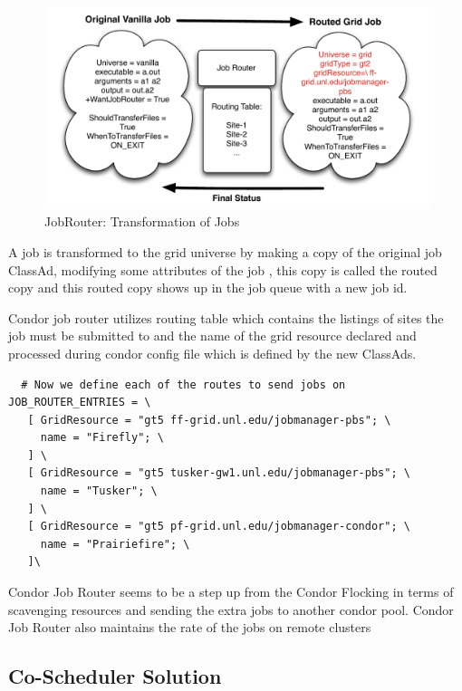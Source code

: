 \documentclass[ms,electronic,double]{nuthesis}
\begin{document}
\begin{figure}[htbp!]
\begin{center}
\includegraphics[scale=0.75]{images/jobRouter}
\caption{JobRouter: Transformation of Jobs}
\label{fig:JobRouter}
\end{center}
\end{figure}

A job is transformed to the grid universe by making a copy of the original job 
ClassAd, modifying some attributes of the job , this copy is called the routed 
copy and this routed copy shows up in the job queue with a new job id.

Condor job router utilizes routing table which contains the listings of sites 
the job must be submitted to and the name of the grid resource declared and 
processed during condor config file which is defined by the new ClassAds.

\begin{lstlisting}
  # Now we define each of the routes to send jobs on
JOB_ROUTER_ENTRIES = \
   [ GridResource = "gt5 ff-grid.unl.edu/jobmanager-pbs"; \
     name = "Firefly"; \
   ] \
   [ GridResource = "gt5 tusker-gw1.unl.edu/jobmanager-pbs"; \
     name = "Tusker"; \
   ] \
   [ GridResource = "gt5 pf-grid.unl.edu/jobmanager-condor"; \
     name = "Prairiefire"; \
   ]\

\end{lstlisting}


Condor Job Router seems to be a step up from the Condor Flocking in terms of 
scavenging resources and sending the extra jobs to another condor pool. Condor 
Job Router also maintains the rate of the jobs on remote clusters

\subsection{Co-Scheduler Solution}
\end{document}
